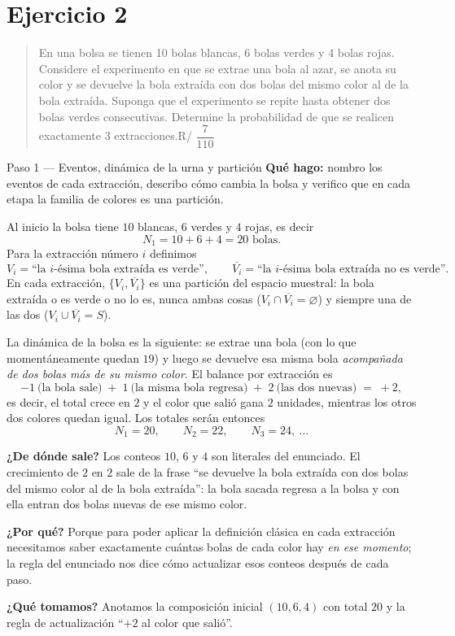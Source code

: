 \documentclass[11pt]{article}
\begin{document}
\section*{Ejercicio 2}

\begin{quote}
En una bolsa se tienen 10 bolas blancas, 6 bolas verdes y 4 bolas rojas. Considere el experimento en que se extrae una bola al azar, se anota su color y se devuelve la bola extraída con dos bolas del mismo color al de la bola extraída. Suponga que el experimento se repite hasta obtener dos bolas verdes consecutivas. Determine la probabilidad de que se realicen exactamente 3 extracciones.\hfill R/ $\dfrac{7}{110}$
\end{quote}

\begin{paso}{Paso 1 --- Eventos, dinámica de la urna y partición}
\textbf{Qué hago:} nombro los eventos de cada extracción, describo cómo cambia la bolsa y verifico que en cada etapa la familia de colores es una partición.

Al inicio la bolsa tiene $10$ blancas, $6$ verdes y $4$ rojas, es decir
\[
N_1=10+6+4=20 \text{ bolas.}
\]
Para la extracción número $i$ definimos
\[
V_i=\text{``la $i$-ésima bola extraída es verde''},
\qquad
\overline{V_i}=\text{``la $i$-ésima bola extraída no es verde''}.
\]
En cada extracción, $\{V_i,\overline{V_i}\}$ es una partición del espacio muestral: la bola extraída o es verde o no lo es, nunca ambas cosas ($V_i\cap\overline{V_i}=\varnothing$) y siempre una de las dos ($V_i\cup\overline{V_i}=S$).

La dinámica de la bolsa es la siguiente: se extrae una bola (con lo que momentáneamente quedan $19$) y luego se devuelve esa misma bola \emph{acompañada de dos bolas más de su mismo color}. El balance por extracción es
\[
-1\ \text{(la bola sale)}\;+\;1\ \text{(la misma bola regresa)}\;+\;2\ \text{(las dos nuevas)}\;=\;+2 ,
\]
es decir, el total crece en $2$ y el color que salió gana $2$ unidades, mientras los otros dos colores quedan igual. Los totales serán entonces
\[
N_1=20,\qquad N_2=22,\qquad N_3=24,\ \dots
\]

\textbf{¿De dónde sale?} Los conteos $10$, $6$ y $4$ son literales del enunciado. El crecimiento de $2$ en $2$ sale de la frase ``se devuelve la bola extraída con dos bolas del mismo color al de la bola extraída'': la bola sacada regresa a la bolsa y con ella entran dos bolas nuevas de ese mismo color.

\textbf{¿Por qué?} Porque para poder aplicar la definición clásica en cada extracción necesitamos saber exactamente cuántas bolas de cada color hay \emph{en ese momento}; la regla del enunciado nos dice cómo actualizar esos conteos después de cada paso.

\textbf{¿Qué tomamos?} Anotamos la composición inicial $(10,6,4)$ con total $20$ y la regla de actualización ``$+2$ al color que salió''.
\end{paso}
\end{document}
